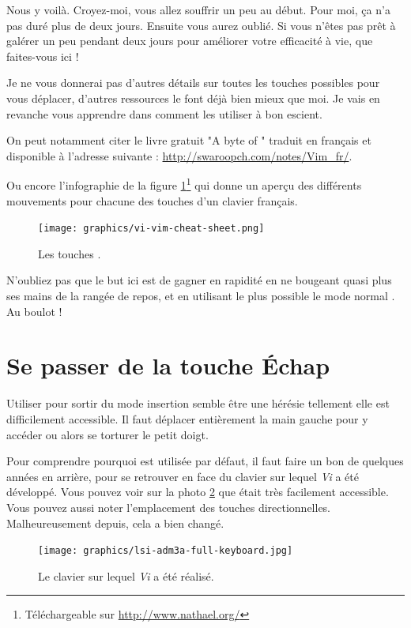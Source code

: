 Nous y voilà. Croyez-moi, vous allez souffrir un peu au début. Pour moi, ça n'a pas duré plus de deux jours. Ensuite vous aurez oublié. Si vous n'êtes pas prêt à galérer un peu pendant deux jours pour améliorer votre efficacité à vie, que faites-vous ici !

Je ne vous donnerai pas d'autres détails sur toutes les touches possibles pour vous déplacer, d'autres ressources le font déjà bien mieux que moi. Je vais en revanche vous apprendre dans  comment les utiliser à bon escient.

On peut notamment citer le livre gratuit "A byte of \vim" traduit en français et disponible à l'adresse suivante : \url{http://swaroopch.com/notes/Vim_fr/}.

Ou encore l'infographie de la figure \ref{fig:vim-cheat-sheet}\footnote{Téléchargeable sur \url{http://www.nathael.org/}} qui donne un aperçu des différents mouvements pour chacune des touches d'un clavier français.

\begin{figure}%
  \texttt{[image: graphics/vi-vim-cheat-sheet.png]}
  \caption{Les touches \vim.}
  \label{fig:vim-cheat-sheet}
\end{figure}

N'oubliez pas que le but ici est de gagner en rapidité en ne bougeant quasi plus ses mains de la rangée de repos, et en utilisant le plus possible le \og mode normal \fg. Au boulot !

\section{Se passer de la touche Échap}\label{sec:esc}

Utiliser \ttesc pour sortir du mode \og insertion \fg{} semble être une hérésie tellement elle est difficilement accessible. Il faut déplacer entièrement la main gauche pour y accéder ou alors se torturer le petit doigt.

Pour comprendre pourquoi \ttesc est utilisée par défaut, il faut faire un bon de quelques années en arrière, pour se retrouver en face du clavier sur lequel \emph{Vi} a été développé. Vous pouvez voir sur la photo \ref{fig:vim-keyboard} que \ttesc était très facilement accessible. Vous pouvez aussi noter l'emplacement des touches directionnelles. Malheureusement depuis, cela a bien changé.

\begin{figure}%
  \texttt{[image: graphics/lsi-adm3a-full-keyboard.jpg]}
  \caption{Le clavier sur lequel \emph{Vi} a été réalisé.}
  \label{fig:vim-keyboard}
\end{figure}

